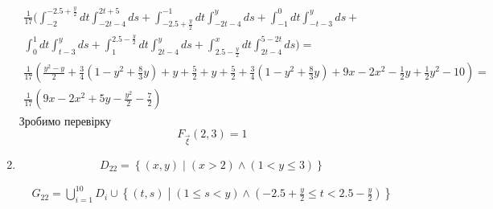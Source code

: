 \documentclass{article}
\begin{document}
\begin{enumerate}
\[\begin{gathered}
		\frac{1}{17}(\int_{-2}^{-2.5 + \frac{y}{2}} dt \int_{-2t-4}^{2t+5} ds + \int_{-2.5 + \frac{y}{2}}^{-1}dt\int_{-2t-4}^{y}ds + \int_{-1}^{0}dt\int_{-t-3}^{y}ds +  \\ \int_{0}^{1}dt\int_{t-3}^{y}ds + \int_{1}^{2.5 - \frac{y}{2}}dt \int_{2t-4}^{y}ds + 
		\int_{2.5 - \frac{y}{2}}^{x} dt \int_{2t-4}^{5-2t} ds) = \\
		\frac{1}{17}\left( \frac{y^2-y}{2} + \frac{3}{4}(1 - y^2 + \frac{8}{3}y) + y + \frac{5}{2} + y + \frac{5}{2} + \frac{3}{4}(1 - y^2 + \frac{8}{3}y) + 9 x - 2 x^2 - \frac{1}{2} y + \frac{1}{2} y^2 -10 \right)  = \\
		\frac{1}{17}\left( 9 x - 2 x^2 + 5y - \frac{y^2}{2} -\frac{7}{2} \right)
	\end{gathered}
	\] 
		Зробимо перевірку 
	\[
	F_{\overrightarrow{\xi}} (2, 3) = 1
	\]
	\newpage
	\item
	\[
	D_{22} = \left\{ (x, y) \middle\vert (x > 2) \wedge ( 1 < y \leq 3) \right\}
	\]
	
	\[
	\begin{gathered}
		G_{22} = \bigcup_{i=1}^{10}D_{i} \cup \left\{ (t, s) \middle\vert (1 \leq s < y) \wedge ( -2.5 + \frac{y}{2} \leq t < 2.5 - \frac{y}{2} ) \right\}
	\end{gathered}
	\]
	

\end{enumerate}
\end{document}
